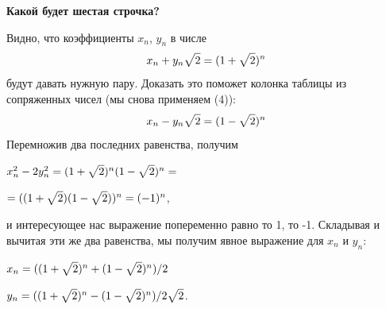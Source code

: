 \begin{multicols}{2}
\smallskip
\normalsize

\noindent \textbf{Какой будет шестая строчка?}
\smallskip

\noindent Видно, что коэффициенты $x_n$, $y_n$ в числе
\[
    x_n + y_n\sqrt{2\mathstrut} = (1 + \sqrt{2\mathstrut})^n
\]
будут давать нужную пару. Доказать это 
поможет колонка таблицы из сопряженных
чисел (мы снова применяем (4)):
\[
    x_n - y_n\sqrt{2\mathstrut} = (1 - \sqrt{2\mathstrut})^n
\]
Перемножив два последних равенства, получим
\smallskip

\noindent $x_n^2 - 2y_n^2 = (1 + \sqrt{2\mathstrut})^n(1 - \sqrt{2\mathstrut})^n = $ 
\smallskip

$=((1 + \sqrt{2\mathstrut})(1 - \sqrt{2\mathstrut}))^n = (-1)^n$,
\smallskip

\noindent и интересующее нас выражение попеременно 
равно то 1, то -1. Складывая и вычитая эти 
же два равенства, мы получим явное 
выражение для $x_n$ и $y_n$:
\smallskip

$x_n = ((1 + \sqrt{2\mathstrut})^n + (1 - \sqrt{2\mathstrut})^n)/2$

$y_n = ((1 + \sqrt{2\mathstrut})^n - (1 - \sqrt{2\mathstrut})^n)/2\sqrt{2\mathstrut}$.

\end{multicols}
